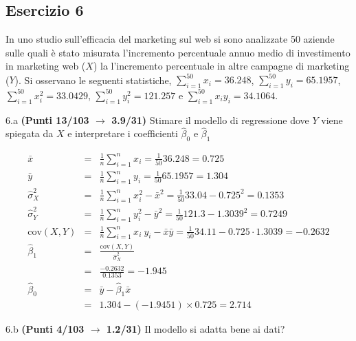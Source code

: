 \documentclass[
  11pt,
]{book}
\theoremstyle{mytheoremstyle}
\theoremstyle{mydefstyle}
\newenvironment{sol}
  {
  \begin{tcolorbox}[enhanced,breakable,arc=0.1mm,boxrule=1pt,colback=white,colframe=iblue,
  title=\bf \fontfamily{lmss}\selectfont \hspace{.5 cm} Soluzione,drop fuzzy shadow]

}{
\end{tcolorbox}
  }
\begin{document}
\subsection{Esercizio 6}\label{esercizio-6-26}

In uno studio sull'efficacia del marketing sul web si sono analizzate 50 aziende
sulle quali è stato misurata l'incremento percentuale annuo medio di investimento in marketing
web (\(X\)) la l'incremento percentuale in altre campagne di marketing (\(Y\)). Si osservano le seguenti statistiche, \(\sum_{i=1}^{50}x_i=36.248\), \(\sum_{i=1}^{50}y_i=65.1957\),
\(\sum_{i=1}^{50}x_i^2=33.0429\), \(\sum_{i=1}^{50}y_i^2=121.257\) e \(\sum_{i=1}^{50}x_iy_i=34.1064\).

6.a \textbf{(Punti 13/103 \(\rightarrow\) 3.9/31)} Stimare il modello di regressione dove \(Y\) viene spiegata da \(X\) e interpretare
i coefficienti \(\hat\beta_0\) e \(\hat\beta_1\)

\begin{sol}
\begin{eqnarray*}
           \bar x &=&\frac 1 n\sum_{i=1}^n x_i = \frac {1}{ 50 }  36.248 =  0.725 \\
           \bar y &=&\frac 1 n\sum_{i=1}^n y_i = \frac {1}{ 50 }  65.1957 =  1.304 \\
           \hat\sigma_X^2&=&\frac 1 n\sum_{i=1}^n x_i^2-\bar x^2=\frac {1}{ 50 }  33.04  - 0.725 ^2= 0.1353 \\
           \hat\sigma_Y^2&=&\frac 1 n\sum_{i=1}^n y_i^2-\bar y^2=\frac {1}{ 50 }  121.3  - 1.3039 ^2= 0.7249 \\
           \text{cov}(X,Y)&=&\frac 1 n\sum_{i=1}^n x_i~y_i-\bar x\bar y=\frac {1}{ 50 }  34.11 - 0.725 \cdot 1.3039 = -0.2632 \\
           \hat\beta_1 &=& \frac{\text{cov}(X,Y)}{\hat\sigma_X^2} \\
                    &=& \frac{ -0.2632 }{ 0.1353 }  =  -1.945 \\
           \hat\beta_0 &=& \bar y - \hat\beta_1 \bar x\\
                    &=&  1.304 - (-1.9451) \times  0.725 = 2.714 
         \end{eqnarray*}

\end{sol}

6.b \textbf{(Punti 4/103 \(\rightarrow\) 1.2/31)} Il modello si adatta bene ai dati?
\end{document}
